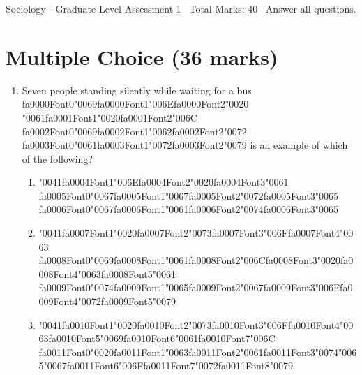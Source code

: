 \documentclass[12pt]{article}
\begin{document}
\begin{center}
Sociology - Graduate Level Assessment 1 \
Total Marks: 40 \
Answer all questions.
\end{center}

\section*{Multiple Choice (36 marks)}
\begin{enumerate}[label=\arabic*.]
\item Seven people standing silently while waiting for a bus {\csname fa0000Font0\endcsname\char"0069}{\csname fa0000Font1\endcsname\char"006E}{\csname fa0000Font2\endcsname\char"0020} {\char"0061}{\csname fa0001Font1\endcsname\char"0020}{\csname fa0001Font2\endcsname\char"006C} {\csname fa0002Font0\endcsname\char"0069}{\csname fa0002Font1\endcsname\char"0062}{\csname fa0002Font2\endcsname\char"0072} {\csname fa0003Font0\endcsname\char"0061}{\csname fa0003Font1\endcsname\char"0072}{\csname fa0003Font2\endcsname\char"0079} is an example of which of the following?
\begin{enumerate}[label=(\alph*)]
    \item {\char"0041}{\csname fa0004Font1\endcsname\char"006E}{\csname fa0004Font2\endcsname\char"0020}{\csname fa0004Font3\endcsname\char"0061} {\csname fa0005Font0\endcsname\char"0067}{\csname fa0005Font1\endcsname\char"0067}{\csname fa0005Font2\endcsname\char"0072}{\csname fa0005Font3\endcsname\char"0065} {\csname fa0006Font0\endcsname\char"0067}{\csname fa0006Font1\endcsname\char"0061}{\csname fa0006Font2\endcsname\char"0074}{\csname fa0006Font3\endcsname\char"0065}
    \item {\char"0041}{\csname fa0007Font1\endcsname\char"0020}{\csname fa0007Font2\endcsname\char"0073}{\csname fa0007Font3\endcsname\char"006F}{\csname fa0007Font4\endcsname\char"0063} {\csname fa0008Font0\endcsname\char"0069}{\csname fa0008Font1\endcsname\char"0061}{\csname fa0008Font2\endcsname\char"006C}{\csname fa0008Font3\endcsname\char"0020}{\csname fa0008Font4\endcsname\char"0063}{\csname fa0008Font5\endcsname\char"0061} {\csname fa0009Font0\endcsname\char"0074}{\csname fa0009Font1\endcsname\char"0065}{\csname fa0009Font2\endcsname\char"0067}{\csname fa0009Font3\endcsname\char"006F}{\csname fa0009Font4\endcsname\char"0072}{\csname fa0009Font5\endcsname\char"0079}
    \item {\char"0041}{\csname fa0010Font1\endcsname\char"0020}{\csname fa0010Font2\endcsname\char"0073}{\csname fa0010Font3\endcsname\char"006F}{\csname fa0010Font4\endcsname\char"0063}{\csname fa0010Font5\endcsname\char"0069}{\csname fa0010Font6\endcsname\char"0061}{\csname fa0010Font7\endcsname\char"006C} {\csname fa0011Font0\endcsname\char"0020}{\csname fa0011Font1\endcsname\char"0063}{\csname fa0011Font2\endcsname\char"0061}{\csname fa0011Font3\endcsname\char"0074}{\char"0065}{\char"0067}{\csname fa0011Font6\endcsname\char"006F}{\csname fa0011Font7\endcsname\char"0072}{\csname fa0011Font8\endcsname\char"0079}

\end{enumerate}
\end{enumerate}
\end{document}
